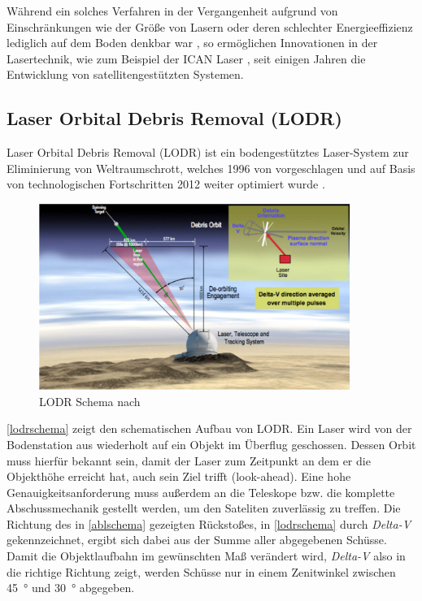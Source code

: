 \documentclass{article}
\begin{document}
Während ein solches Verfahren in der Vergangenheit aufgrund von Einschränkungen wie der Größe von Lasern oder deren schlechter Energieeffizienz lediglich auf dem Boden denkbar war \citep{p12q6lreq}, so ermöglichen Innovationen in der Lasertechnik, wie zum Beispiel der ICAN Laser \citep{icanlaser}, seit einigen Jahren die Entwicklung von satellitengestützten Systemen. 

\subsection{Laser Orbital Debris Removal (LODR)}
Laser Orbital Debris Removal (LODR) ist ein bodengestütztes Laser-System zur Eliminierung von Weltraumschrott, welches 1996 von \citet{phipps1996orion} vorgeschlagen und auf Basis von technologischen Fortschritten 2012 weiter optimiert wurde \citep{phipps11}. 
\begin{figure}[H]
	\centering
	\includegraphics[width = 0.9\textwidth]{images/LODR_konzept.jpg}
	\caption{LODR Schema nach \citet{phipps11}}
	\label{lodrschema}
\end{figure}
\noindent \autoref{lodrschema} zeigt den schematischen Aufbau von LODR. Ein Laser wird von der Bodenstation aus wiederholt auf ein Objekt im Überflug geschossen. Dessen Orbit muss hierfür bekannt sein, damit der Laser zum Zeitpunkt an dem er die Objekthöhe erreicht hat, auch sein Ziel trifft (look-ahead). Eine hohe Genauigkeitsanforderung muss außerdem an die Teleskope bzw. die komplette Abschussmechanik gestellt werden, um den Sateliten zuverlässig zu treffen. Die Richtung des in \autoref{ablschema} gezeigten Rückstoßes, in \autoref{lodrschema} durch \textit{Delta-V} gekennzeichnet, ergibt sich dabei aus der Summe aller abgegebenen Schüsse. Damit die Objektlaufbahn im gewünschten Maß verändert wird, \textit{Delta-V} also in die richtige Richtung zeigt, werden Schüsse nur in einem Zenitwinkel zwischen \SI{45}{\degree} und \SI{30}{\degree} abgegeben.\\\\
\end{document}
